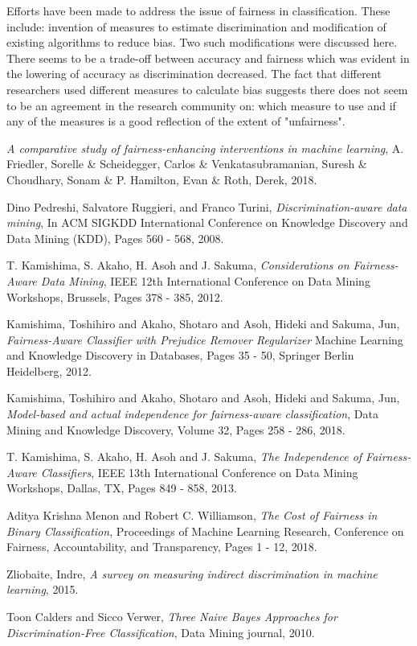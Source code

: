 \documentclass[a4paper, 12pt, notitlepage]{article}
\begin{document}
Efforts have been made to address the issue of fairness in classification. These include: invention of measures to estimate discrimination and modification of existing algorithms to reduce bias. Two such modifications were discussed here. There seems to be a trade-off between accuracy and fairness which was evident in the lowering of accuracy as discrimination decreased. The fact that different researchers used different measures to calculate bias suggests there does not seem to be an agreement in the research community on: which measure to use and if any of the measures is a good reflection of the extent of "unfairness". 

\begin{thebibliography}{10}

  
  \textit{A comparative study of fairness-enhancing interventions in machine learning},
  A. Friedler, Sorelle \& Scheidegger, Carlos \& Venkatasubramanian, Suresh \& Choudhary, Sonam \& P. Hamilton, Evan \& Roth, Derek,
  2018. 
  
  Dino Pedreshi, Salvatore Ruggieri, and Franco Turini,
  \textit{Discrimination-aware data mining},
  In ACM SIGKDD International Conference on Knowledge Discovery and Data Mining (KDD),
  Pages 560 - 568, 
  2008.

  T. Kamishima, S. Akaho, H. Asoh and J. Sakuma,
  \textit{Considerations on Fairness-Aware Data Mining},
  IEEE 12th International Conference on Data Mining Workshops, Brussels,
  Pages 378 - 385,
  2012.

  Kamishima, Toshihiro and Akaho, Shotaro and Asoh, Hideki and Sakuma, Jun,
  \textit{Fairness-Aware Classifier with Prejudice Remover Regularizer}
  Machine Learning and Knowledge Discovery in Databases,
  Pages 35 - 50,
  Springer Berlin Heidelberg,
  2012.

  Kamishima, Toshihiro and Akaho, Shotaro and Asoh, Hideki and Sakuma, Jun,
  \textit{Model-based and actual independence for fairness-aware classification},
  Data Mining and Knowledge Discovery,
  Volume 32,
  Pages 258 - 286,
  2018.

  T. Kamishima, S. Akaho, H. Asoh and J. Sakuma, 
  \textit{The Independence of Fairness-Aware Classifiers},
  IEEE 13th International Conference on Data Mining Workshops, Dallas, TX,
  Pages 849 - 858,
  2013.

  Aditya Krishna Menon and Robert C. Williamson,
  \textit{The Cost of Fairness in Binary Classification},
  Proceedings of Machine Learning Research,
  Conference on Fairness, Accountability, and Transparency,
  Pages 1 - 12,
  2018.

  Zliobaite, Indre,
  \textit{A survey on measuring indirect discrimination in machine learning},
  2015. 


  Toon Calders and Sicco Verwer,
  \textit{Three Naive Bayes Approaches for Discrimination-Free Classification},
  Data Mining journal,
  2010. 

\end{thebibliography}
\end{document}

